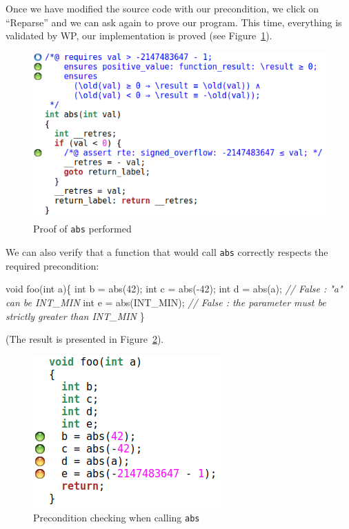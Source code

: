 \documentclass[12pt,francais,]{scrbook}
\newenvironment{Shaded}{}{}
\newcommand{\DataTypeTok}[1]{\textcolor[rgb]{0.56,0.13,0.00}{{#1}}}
\newcommand{\DecValTok}[1]{\textcolor[rgb]{0.25,0.63,0.44}{{#1}}}
\newcommand{\CommentTok}[1]{\textcolor[rgb]{0.38,0.63,0.69}{\textit{{#1}}}}
\newcommand{\NormalTok}[1]{{#1}}
\begin{document}
Once we have modified the source code with our precondition, we click on
``Reparse'' and we can ask again to prove our program. This time,
everything is validated by WP, our implementation is proved
(see Figure~\ref{fig:2-1-2-abs-1}).

\begin{figure}[htbp]
\centering
\includegraphics[scale=0.5]{2-1-2-abs-1.png}
\caption{Proof of \texttt{abs} performed}
\label{fig:2-1-2-abs-1}
\end{figure}

We can also verify that a function that would call \texttt{abs}
correctly respects the required precondition:

\begin{footnotesize}\begin{Shaded}
\begin{Highlighting}[]
\DataTypeTok{void} \NormalTok{foo(}\DataTypeTok{int} \NormalTok{a)\{}
   \DataTypeTok{int} \NormalTok{b = abs(}\DecValTok{42}\NormalTok{);}
   \DataTypeTok{int} \NormalTok{c = abs(-}\DecValTok{42}\NormalTok{);}
   \DataTypeTok{int} \NormalTok{d = abs(a);       }\CommentTok{// False : "a" can be INT_MIN}
   \DataTypeTok{int} \NormalTok{e = abs(INT_MIN); }\CommentTok{// False : the parameter must be strictly greater than INT_MIN}
\NormalTok{\}}
\end{Highlighting}
\end{Shaded}\end{footnotesize}

(The result is presented in Figure~\ref{fig:2-1-2-foo-1}).

\begin{figure}[htbp]
\centering
\includegraphics[scale=0.5]{2-1-2-foo-1.png}
\caption{Precondition checking when calling \texttt{abs}}
\label{fig:2-1-2-foo-1}
\end{figure}
\end{document}
